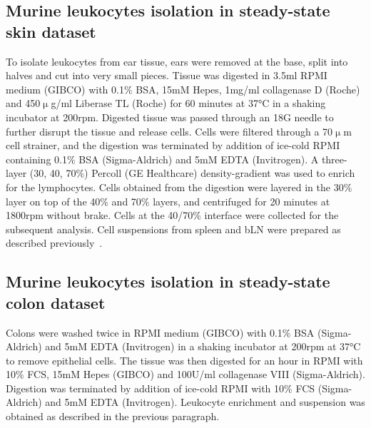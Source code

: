 \subsection{Murine leukocytes isolation in steady-state skin dataset}
To isolate leukocytes from ear tissue, ears were removed at the base, split into halves and cut into very small pieces. Tissue was digested in 3.5ml RPMI medium (GIBCO) with 0.1${\%}$ BSA, 15mM Hepes, 1mg/ml collagenase D (Roche) and 450${\upmu}$g/ml Liberase TL (Roche) for 60 minutes at 37°C in a shaking incubator at 200rpm. Digested tissue was passed through an 18G needle to further disrupt the tissue and release cells. Cells were filtered through a 70${\upmu}$m cell strainer, and the digestion was terminated by addition of ice-cold RPMI containing 0.1${\%}$ BSA (Sigma-Aldrich) and 5mM EDTA (Invitrogen). A three-layer (30, 40, 70${\%}$) Percoll (GE Healthcare) density-gradient was used to enrich for the lymphocytes. Cells obtained from the digestion were layered in the 30${\%}$ layer on top of the 40${\%}$ and 70${\%}$ layers, and centrifuged for 20 minutes at 1800rpm without brake. Cells at the 40/70${\%}$ interface were collected for the subsequent analysis. Cell suspensions from spleen and bLN were prepared as described previously~\citep{Uhlig2006-om}.

\subsection{Murine leukocytes isolation in steady-state colon dataset}
Colons were washed twice in RPMI medium (GIBCO) with 0.1${\%}$ BSA (Sigma-Aldrich) and 5mM EDTA (Invitrogen) in a shaking incubator at 200rpm at 37°C to remove epithelial cells. The tissue was then digested for an hour in RPMI with 10${\%}$ FCS, 15mM Hepes (GIBCO) and 100U/ml collagenase VIII (Sigma-Aldrich). Digestion was terminated by addition of ice-cold RPMI with 10${\%}$ FCS (Sigma-Aldrich) and 5mM EDTA (Invitrogen). Leukocyte enrichment and suspension was obtained as described in the previous paragraph.

